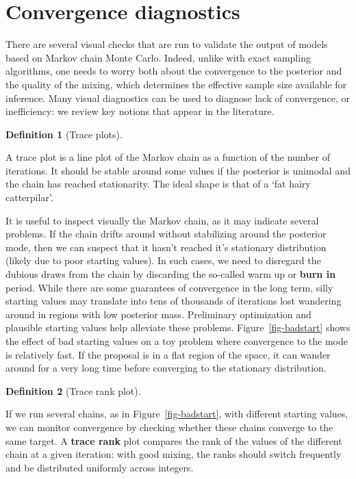 \documentclass[
  11pt,
  letterpaper,
]{scrbook}
\theoremstyle{definition}
\newtheorem{definition}{Definition}[chapter]
\theoremstyle{plain}
\theoremstyle{plain}
\theoremstyle{plain}
\theoremstyle{definition}
\theoremstyle{definition}
\theoremstyle{remark}
\begin{document}
\section{Convergence diagnostics}\label{convergence-diagnostics}

There are several visual checks that are run to validate the output of
models based on Markov chain Monte Carlo. Indeed, unlike with exact
sampling algorithms, one needs to worry both about the convergence to
the posterior and the quality of the mixing, which determines the
effective sample size available for inference. Many visual diagnostics
can be used to diagnose lack of convergence, or inefficiency: we review
key notions that appear in the literature.

\begin{definition}[Trace
plots]\protect\hypertarget{def-traceplots}{}\label{def-traceplots}

A trace plot is a line plot of the Markov chain as a function of the
number of iterations. It should be stable around some values if the
posterior is unimodal and the chain has reached stationarity. The ideal
shape is that of a `fat hairy catterpilar'.

\end{definition}

It is useful to inspect visually the Markov chain, as it may indicate
several problems. If the chain drifts around without stabilizing around
the posterior mode, then we can suspect that it hasn't reached it's
stationary distribution (likely due to poor starting values). In such
cases, we need to disregard the dubious draws from the chain by
discarding the so-called warm up or \textbf{burn in} period. While there
are some guarantees of convergence in the long term, silly starting
values may translate into tens of thousands of iterations lost wandering
around in regions with low posterior mass. Preliminary optimization and
plausible starting values help alleviate these problems.
Figure~\ref{fig-badstart} shows the effect of bad starting values on a
toy problem where convergence to the mode is relatively fast. If the
proposal is in a flat region of the space, it can wander around for a
very long time before converging to the stationary distribution.

\begin{definition}[Trace rank
plot]\protect\hypertarget{def-trankplot}{}\label{def-trankplot}

If we run several chains, as in Figure~\ref{fig-badstart}, with
different starting values, we can monitor convergence by checking
whether these chains converge to the same target. A \textbf{trace rank}
plot compares the rank of the values of the different chain at a given
iteration: with good mixing, the ranks should switch frequently and be
distributed uniformly across integers.

\end{definition}
\end{document}
